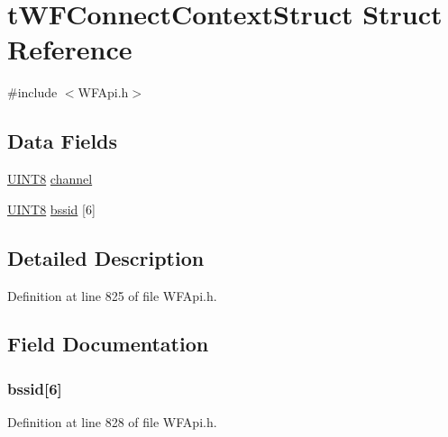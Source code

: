 \hypertarget{structt_w_f_connect_context_struct}{}\section{t\+W\+F\+Connect\+Context\+Struct Struct Reference}
\label{structt_w_f_connect_context_struct}


{\ttfamily \#include $<$W\+F\+Api.\+h$>$}

\subsection*{Data Fields}
\begin{DoxyCompactItemize}
\item 
\hyperlink{_generic_type_defs_8h_ab27e9918b538ce9d8ca692479b375b6a}{U\+I\+N\+T8} \hyperlink{structt_w_f_connect_context_struct_a52d69a3bd7bdfdfc6f9e40f4962c575d}{channel}
\item 
\hyperlink{_generic_type_defs_8h_ab27e9918b538ce9d8ca692479b375b6a}{U\+I\+N\+T8} \hyperlink{structt_w_f_connect_context_struct_af1eb240ad4299a104d0bf3fddcabbb95}{bssid} \mbox{[}6\mbox{]}
\end{DoxyCompactItemize}


\subsection{Detailed Description}


Definition at line 825 of file W\+F\+Api.\+h.



\subsection{Field Documentation}
\hypertarget{structt_w_f_connect_context_struct_af1eb240ad4299a104d0bf3fddcabbb95}{}
\subsubsection[{bssid}]{ bssid\mbox{[}6\mbox{]}}\label{structt_w_f_connect_context_struct_af1eb240ad4299a104d0bf3fddcabbb95}


Definition at line 828 of file W\+F\+Api.\+h.

